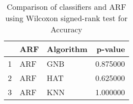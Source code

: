 \begin{table}
\footnotesize
\caption{Comparison of classifiers and ARF using Wilcoxon signed-rank test for Accuracy}
\label{tab:ARF wilcoxon Accuracy comparison}
\begin{tabular}{lllr}
\hline
 & ARF & Algorithm & p-value \\
\hline
1 & ARF & GNB & 0.875000 \\
2 & ARF & HAT & 0.625000 \\
3 & ARF & KNN & 1.000000 \\
\hline
\end{tabular}
\end{table}
